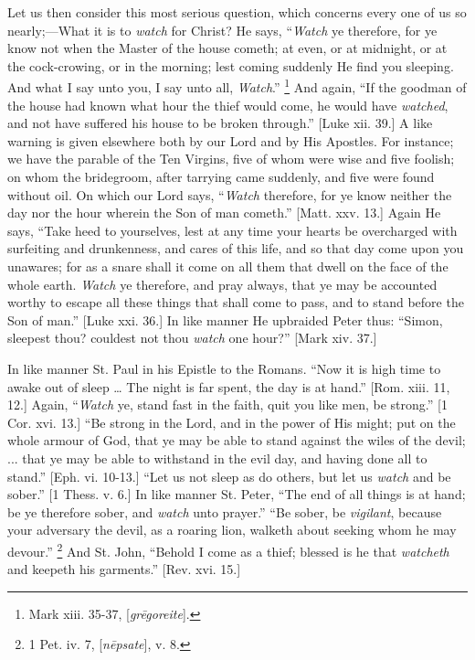 Let us then consider this most serious question, which concerns
every one of us so nearly;—What it is to \emph{watch} for Christ? He
says, ``\emph{Watch} ye therefore, for ye know not when the Master
of the house cometh; at even, or at midnight, or at the cock-crowing,
or in the morning; lest coming suddenly He find you sleeping. And what
I say unto you, I say unto all, \emph{Watch}.'' \footnote{Mark xiii. 35-37, [\emph{gr\={e}goreite}].} And again, ``If the goodman of the house had known what
hour the thief would come, he would have \emph{watched}, and not have
suffered his house to be broken through.'' [Luke xii. 39.] A like
warning is given elsewhere both by our Lord and by His Apostles. For
instance; we have the parable of the Ten Virgins, five of whom were
wise and five foolish; on whom the bridegroom, after tarrying came
suddenly, and five were found without oil. On which our Lord says,
``\emph{Watch} therefore, for ye know neither the day nor the hour
wherein the Son of man cometh.'' [Matt. xxv. 13.] Again He says,
``Take heed to yourselves, lest at any time your hearts be
overcharged with surfeiting and drunkenness, and cares of this life,
and so that day come upon you unawares; for as a snare shall it come
on all them that dwell on the face of the whole earth. \emph{Watch} ye
therefore, and pray always, that ye may be accounted worthy to escape
all these things that shall come to pass, and to stand before the Son
of man.'' [Luke xxi. 36.] In like manner He upbraided Peter thus:
``Simon, sleepest thou? couldest not thou \emph{watch} one
hour?'' [Mark xiv. 37.]

In like manner St. Paul in his Epistle to the Romans. ``Now it
is high time to awake out of sleep … The night is far spent, the day
is at hand.'' [Rom. xiii. 11, 12.] Again, ``\emph{Watch} ye,
stand fast in the faith, quit you like men, be strong.'' [1 Cor.
xvi. 13.] ``Be strong in the Lord, and in the power of His might;
put on the whole armour of God, that ye may be able to stand against
the wiles of the devil; ... that ye may be able to withstand in the
evil day, and having done all to stand.'' [Eph. vi. 10-13.]
``Let us not sleep as do others, but let us \emph{watch} and be
sober.'' [1 Thess. v. 6.] In like manner St. Peter, ``The end
of all things is at hand; be ye therefore sober, and \emph{watch} unto
prayer.'' ``Be sober, be \emph{vigilant}, because your
adversary the devil, as a roaring lion, walketh about seeking whom he
may devour.'' \footnote{1 Pet. iv. 7, [\emph{n\={e}psate}],
v. 8.} And St.
John, ``Behold I come as a thief; blessed is he that \emph{watcheth} and
keepeth his garments.'' [Rev. xvi. 15.]


